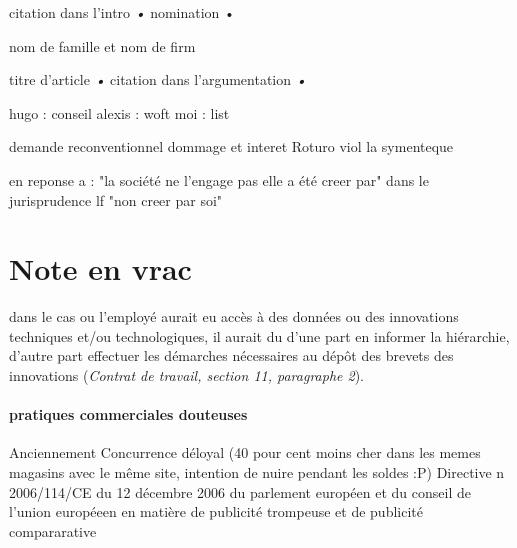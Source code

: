 citation dans l'intro \emph{•}
nomination \textsc{•}

nom de famille et nom de firm \textsc{}

titre d'article \textit{•}
citation dans l'argumentation \emph{•}


hugo : conseil
alexis : woft
moi : list

demande reconventionnel
dommage et interet
Roturo viol la symenteque

en reponse a : "la société ne l'engage pas elle a été creer par" dans le jurisprudence lf "non creer par soi"

\section{Note en vrac}

dans le cas ou l'employé aurait eu accès à des données ou des innovations techniques et/ou technologiques, il aurait du d'une part en informer la hiérarchie, d'autre part effectuer les démarches nécessaires au dépôt des brevets des innovations (\textit{Contrat de travail, section 11, paragraphe 2}).


\paragraph{pratiques commerciales douteuses }

Anciennement Concurrence déloyal (40 pour cent moins cher dans les memes magasins avec le même site, intention de nuire pendant les soldes :P) Directive n 2006/114/CE du 12 décembre 2006 du parlement européen et du conseil de l’union européeen en matière de publicité trompeuse et de publicité compararative

